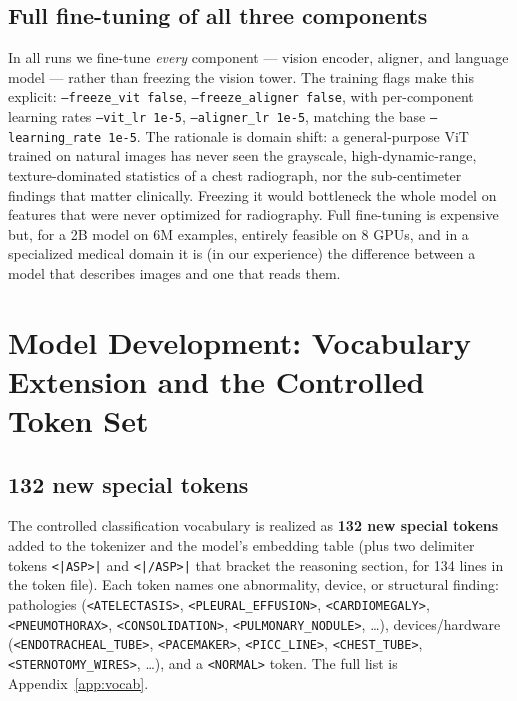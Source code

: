 \documentclass[11pt,a4paper]{article}
\begin{document}
\subsection{Full fine-tuning of all three components}
In all runs we fine-tune \emph{every} component --- vision encoder, aligner, and language model --- rather than freezing the vision tower. The training flags make this explicit: \texttt{--freeze\_vit false}, \texttt{--freeze\_aligner false}, with per-component learning rates \texttt{--vit\_lr 1e-5}, \texttt{--aligner\_lr 1e-5}, matching the base \texttt{--learning\_rate 1e-5}. The rationale is domain shift: a general-purpose ViT trained on natural images has never seen the grayscale, high-dynamic-range, texture-dominated statistics of a chest radiograph, nor the sub-centimeter findings that matter clinically. Freezing it would bottleneck the whole model on features that were never optimized for radiography. Full fine-tuning is expensive but, for a 2B model on 6M examples, entirely feasible on 8 GPUs, and in a specialized medical domain it is (in our experience) the difference between a model that describes images and one that reads them.

\section{Model Development: Vocabulary Extension and the Controlled Token Set}
\label{sec:vocab}

\subsection{132 new special tokens}
The controlled classification vocabulary is realized as \textbf{132 new special tokens} added to the tokenizer and the model's embedding table (plus two delimiter tokens \texttt{<|ASP>|} and \texttt{<|/ASP>|} that bracket the reasoning section, for 134 lines in the token file). Each token names one abnormality, device, or structural finding: pathologies (\texttt{<ATELECTASIS>}, \texttt{<PLEURAL\_EFFUSION>}, \texttt{<CARDIOMEGALY>}, \texttt{<PNEUMOTHORAX>}, \texttt{<CONSOLIDATION>}, \texttt{<PULMONARY\_NODULE>}, \dots), devices/hardware (\texttt{<ENDOTRACHEAL\_TUBE>}, \texttt{<PACEMAKER>}, \texttt{<PICC\_LINE>}, \texttt{<CHEST\_TUBE>}, \texttt{<STERNOTOMY\_WIRES>}, \dots), and a \texttt{<NORMAL>} token. The full list is Appendix~\ref{app:vocab}.
\end{document}
